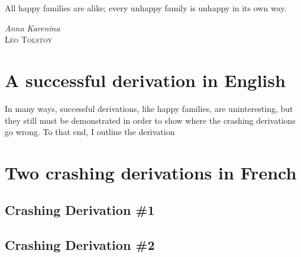 \documentclass[MilwayThesis]{subfiles}
\begin{document}
\epigraph{All happy families are alike; every unhappy family is unhappy in its own way.}{\textit{Anna Karenina}\\\textsc{Leo Tolstoy}}
\section{A successful derivation in English}
In many ways, successful derivations, like happy families, are uninteresting, but they still must be demonstrated in order to show where the crashing derivations go wrong.
To that end, I outline the derivation
\section{Two crashing derivations in French}

\subsection{Crashing Derivation \#1}

\subsection{Crashing Derivation \#2}
\end{document}
